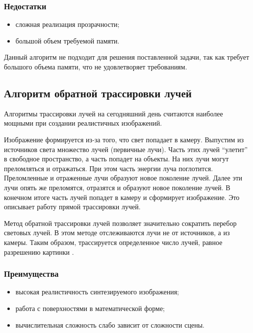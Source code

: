 \subsubsection*{Недостатки}
\begin{itemize}
	\item сложная реализация прозрачности;
	\item большой объем требуемой памяти.
\end{itemize}

Данный алгоритм не подходит для решения поставленной задачи, так как требует большого объема памяти, что не удовлетворяет требованиям. 

\subsection{Алгоритм обратной трассировки лучей}
Алгоритмы трассировки лучей на сегодняшний день считаются наиболее мощными при создании реалистичных изображений. 

Изображение формируется из-за того, что свет попадает в камеру. Выпустим из источников света множество лучей (первичные лучи). Часть этих лучей “улетит” в свободное пространство, а часть попадет на объекты. На них лучи могут преломляться и отражаться. При этом часть энергии луча поглотится. Преломленные и отраженные лучи образуют новое поколение лучей. Далее эти лучи опять же преломятся, отразятся и образуют новое поколение лучей. В конечном итоге часть лучей попадет в камеру и сформирует изображение. Это описывает работу прямой трассировки лучей.

Метод обратной трассировки лучей позволяет значительно сократить перебор световых лучей. В этом методе отслеживаются лучи не от источников, а из камеры. Таким образом, трассируется определенное число лучей, равное разрешению картинки \cite{raytrace}.

\subsubsection*{Преимущества}
\begin{itemize}
\item	высокая реалистичность синтезируемого изображения;
\item	работа с поверхностями в математической форме;
\item	вычислительная сложность слабо зависит от сложности сцены.
\end{itemize}

